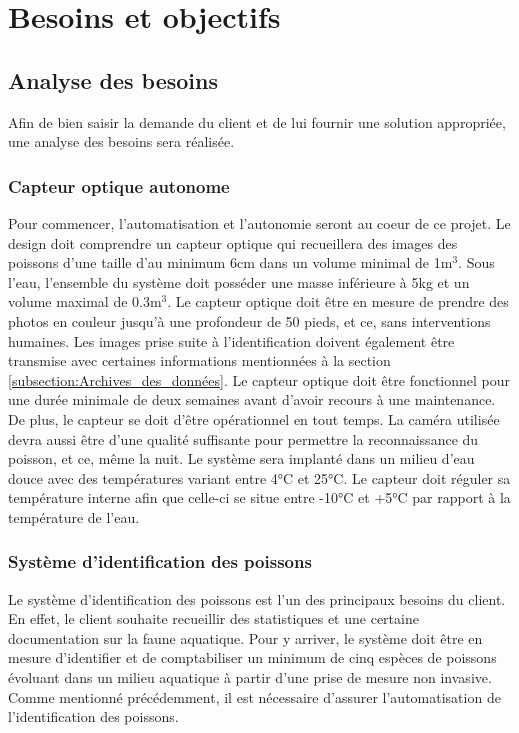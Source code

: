 
%
%

\chapter{Besoins et objectifs}
\label{s:objectifs}

\section{Analyse des besoins}

Afin de bien saisir la demande du client et de lui fournir une solution appropriée, une analyse des besoins sera réalisée. 

\subsection{Capteur optique autonome}

Pour commencer, l'automatisation et l'autonomie seront au coeur de ce projet. Le design doit comprendre un capteur optique qui recueillera des images des poissons d'une taille d'au minimum 6cm dans un volume minimal de 1m$^3$. Sous l'eau, l'ensemble du système doit posséder une masse inférieure à 5kg et un volume maximal de 0.3m$^3$. Le capteur optique doit être en mesure de prendre des photos en couleur jusqu'à une profondeur de 50 pieds, et ce, sans interventions humaines. Les images prise suite à l'identification doivent également être transmise avec certaines informations mentionnées à la section \ref{subsection:Archives_des_données}. Le capteur optique doit être fonctionnel pour une durée minimale de deux semaines avant d'avoir recours à une maintenance. De plus, le capteur se doit d'être opérationnel en tout temps. La caméra utilisée devra aussi être d'une qualité suffisante pour permettre la reconnaissance du poisson, et ce, même la nuit. Le système sera implanté dans un milieu d'eau douce avec des températures variant entre 4°C et 25°C. Le capteur doit réguler sa température interne afin que celle-ci se situe entre -10°C et +5°C par rapport à la température de l'eau. 

\subsection{Système d'identification des poissons}

Le système d'identification des poissons est l'un des principaux besoins du client. En effet, le client souhaite recueillir des statistiques et une certaine documentation sur la faune aquatique. Pour y arriver, le système doit être en mesure d'identifier et de comptabiliser un minimum de cinq espèces de poissons évoluant dans un milieu aquatique à partir d'une prise de mesure non invasive. Comme mentionné précédemment, il est nécessaire d'assurer l'automatisation de l'identification des poissons.

